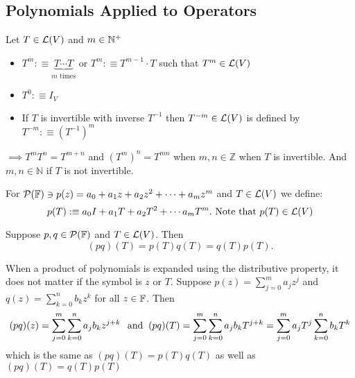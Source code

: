 \subsection{Polynomials Applied to Operators}

\setcounter{thm}{12}
\begin{mydef} [notation $T^m$]
  Let $T \in \mathcal{L}(V)$ and $m\in \mathbb{N}^{+}$
  \begin{itemize}
    \item $T^{m} :\equiv \underbrace{T \cdots T}_{\text{$m$ times}}$ or $T^{m} :\equiv T^{m-1} \cdot T$ such that $T^{m} \in \mathcal{L}(V)$
    \item $T^0 :\equiv I_V$
    \item If $T$ is invertible with inverse $T^{-1}$ then $T^{-m}\in \mathcal{L}(V)$ is defined by $T^{-m} :\equiv (T^{-1})^m$
  \end{itemize}
\end{mydef}
$\implies T^m T^n = T^{m+n}$ and $(T^m)^n=T^{mn}$ when $m,n \in \mathbb{Z}$ when $T$ is invertible. And $m,n \in \mathbb{N}$ if $T$ is not invertible.

\begin{mydef} [notation $p(T)$]
  For $\mathcal{P} (\mathbb{F}) \ni p(z) = a_0+a_1z+a_2z^2+\cdots+a_mz^m$
 and
  $T \in \mathcal{L} (V)$ we define: 
  \begin{equation}
    p(T) :\equiv a_0 I + a_1 T + a_2 T^2 + \cdots a_m T^m.$ Note that $p(T) \in \linmap(V)
  \end{equation}
\end{mydef}



\setcounter{thm}{16}
\begin{thm} 
  \label{multiplicative-properties}
  Suppose $p,q \in \mathcal{P} (\mathbb{F})$ and $T\in \mathcal{L} (V)$. Then \begin{equation}
    (p q)(T) = p(T) q(T) = q(T)p(T).
  \end{equation}
\end{thm}
\begin{prf} When a product of polynomials is expanded using the distributive property, it does not matter if the symbol is $z$ or $T$. Suppose $p(z) = \sum_{j=0}^{m} a_j z^j$ and $q(z)=\sum_{k=0}^{n} b_k z^k$ for all $z \in \mathbb{F}$. Then  %
  \begin{equation}
    (pq)(z) = \sum_{j=0}^{m} \sum_{k=0}^{n} a_j b_k z^{j+k} \;\;\, \text{and}\;\;
    (pq)(T) = \sum_{j=0}^{m} \sum_{k=0}^{n} a_j b_k T^{j+k}
    = \sum_{j=0}^{m} a_j T^j \sum_{k=0}^{n}  b_k T^k
  \end{equation}
  which is the same as $(pq)(T) = p(T)q(T)$ as well as $(pq)(T) = q(T)p(T)$
\end{prf}

